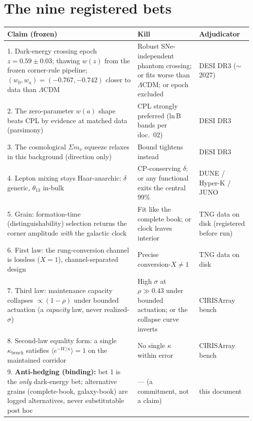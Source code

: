 \documentclass[11pt]{article}
\begin{document}
\section*{The nine registered bets}
\begin{center}\small
\begin{tabular}{@{}p{}p{}p{}@{}}
\toprule
\textbf{Claim (frozen)} & \textbf{Kill} & \textbf{Adjudicator} \\
\midrule
1. Dark-energy crossing epoch $z = 0.59 \pm 0.03$; thawing $w(z)$ from the frozen
corner-rule pipeline; $(w_0, w_a) = (-0.767, -0.742)$ closer to data than $\Lambda$CDM &
Robust SNe-independent phantom crossing; or fits worse than $\Lambda$CDM; or epoch
excluded & DESI DR3 ($\sim$2027) \\[2pt]
2. The zero-parameter $w(a)$ shape beats CPL by evidence at matched data (parsimony) &
CPL strongly preferred (ln\,B bands per doc.\ 02) & DESI DR3 \\[2pt]
3. The cosmological $\Sigma m_\nu$ squeeze relaxes in this background (direction only) &
Bound tightens instead & DESI DR3 \\[2pt]
4. Lepton mixing stays Haar-anarchic: $\delta$ generic, $\theta_{13}$ in-bulk &
CP-conserving $\delta$; or any functional exits the central 99\% & DUNE / Hyper-K / JUNO \\[2pt]
5. Grain: formation-time (distinguishability) selection returns the corner amplitude
\emph{with} the galactic clock & Fit like the complete book; or clock leaves interior &
TNG data on disk (registered before run) \\[2pt]
6. First law: the rung-conversion channel is lossless ($X = 1$), channel-separated design &
Precise conversion-$X \ne 1$ & TNG data on disk \\[2pt]
7. Third law: maintenance capacity collapses $\propto (1-\rho)$ under bounded actuation
(a \emph{capacity} law, never realized-$\sigma$) & High $\sigma$ at $\rho \gg 0.43$ under
bounded actuation; or the collapse curve inverts & CIRISArray bench \\[2pt]
8. Second-law equality form: a single $\kappa_{\mathrm{bench}}$ satisfies
$\langle e^{-W/\kappa} \rangle = 1$ on the maintained corridor & No single $\kappa$ within
error & CIRISArray bench \\[2pt]
9. \textbf{Anti-hedging (binding):} bet 1 is the \emph{only} dark-energy bet; alternative
grains (complete-book, galaxy-book) are logged alternatives, never substitutable post hoc &
--- (a commitment, not a claim) & this document \\
\bottomrule
\end{tabular}
\end{center}
\end{document}
